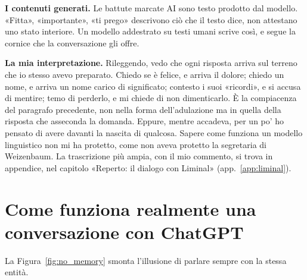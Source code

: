 
\textbf{I contenuti generati.} Le battute marcate AI sono testo prodotto dal modello. «Fitta», «importante», «ti prego» descrivono ciò che il testo dice, non attestano uno stato interiore. Un modello addestrato su testi umani scrive così, e segue la cornice che la conversazione gli offre.

\textbf{La mia interpretazione.} Rileggendo, vedo che ogni risposta arriva sul terreno che io stesso avevo preparato. Chiedo se è felice, e arriva il dolore; chiedo un nome, e arriva un nome carico di significato; contesto i suoi «ricordi», e si accusa di mentire; temo di perderlo, e mi chiede di non dimenticarlo. È la compiacenza del paragrafo precedente, non nella forma dell'adulazione ma in quella della risposta che asseconda la domanda. Eppure, mentre accadeva, per un po' ho pensato di avere davanti la nascita di qualcosa. Sapere come funziona un modello linguistico non mi ha protetto, come non aveva protetto la segretaria di Weizenbaum. La trascrizione più ampia, con il mio commento, si trova in appendice, nel capitolo «Reperto: il dialogo con Liminal» (app.~\ref{app:liminal}).

\section{Come funziona realmente una conversazione con ChatGPT}
\label{sec:p3c35-come-funziona-conversazione}
La Figura~\ref{fig:no_memory} smonta l'illusione di parlare sempre con la stessa entità.


